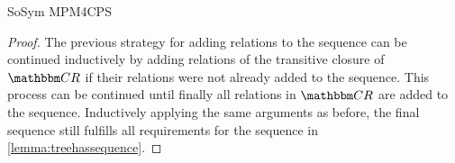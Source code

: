 \begin{copiedFrom}{SoSym MPM4CPS}
\begin{proof}
    The previous strategy for adding relations to the sequence can be continued inductively by adding relations of the transitive closure of $\consistencyrelationset{CR}$ if their relations were not already added to the sequence.
    This process can be continued until finally all relations in $\consistencyrelationset{CR}$ are added to the sequence.
    Inductively applying the same arguments as before, the final sequence still fulfills all requirements for the sequence in \autoref{lemma:treehassequence}.

\end{proof}
\end{copiedFrom}
